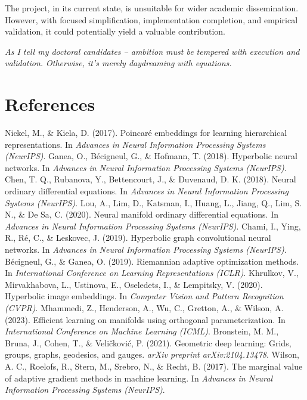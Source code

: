 \documentclass[11pt]{article}
\begin{document}
The project, in its current state, is unsuitable for wider academic dissemination. However, with focused simplification, implementation completion, and empirical validation, it could potentially yield a valuable contribution.

\textit{As I tell my doctoral candidates – ambition must be tempered with execution and validation. Otherwise, it's merely daydreaming with equations.}

\section{References}
\begin{thebibliography}{10}
 Nickel, M., \& Kiela, D. (2017). Poincaré embeddings for learning hierarchical representations. In \textit{Advances in Neural Information Processing Systems (NeurIPS)}.
 Ganea, O., Bécigneul, G., \& Hofmann, T. (2018). Hyperbolic neural networks. In \textit{Advances in Neural Information Processing Systems (NeurIPS)}.
 Chen, T. Q., Rubanova, Y., Bettencourt, J., \& Duvenaud, D. K. (2018). Neural ordinary differential equations. In \textit{Advances in Neural Information Processing Systems (NeurIPS)}.
 Lou, A., Lim, D., Katsman, I., Huang, L., Jiang, Q., Lim, S. N., \& De Sa, C. (2020). Neural manifold ordinary differential equations. In \textit{Advances in Neural Information Processing Systems (NeurIPS)}.
 Chami, I., Ying, R., Ré, C., \& Leskovec, J. (2019). Hyperbolic graph convolutional neural networks. In \textit{Advances in Neural Information Processing Systems (NeurIPS)}.
 Bécigneul, G., \& Ganea, O. (2019). Riemannian adaptive optimization methods. In \textit{International Conference on Learning Representations (ICLR)}.
 Khrulkov, V., Mirvakhabova, L., Ustinova, E., Oseledets, I., \& Lempitsky, V. (2020). Hyperbolic image embeddings. In \textit{Computer Vision and Pattern Recognition (CVPR)}.
 Mhammedi, Z., Henderson, A., Wu, C., Gretton, A., \& Wilson, A. (2023). Efficient learning on manifolds using orthogonal parameterization. In \textit{International Conference on Machine Learning (ICML)}.
 Bronstein, M. M., Bruna, J., Cohen, T., \& Veličković, P. (2021). Geometric deep learning: Grids, groups, graphs, geodesics, and gauges. \textit{arXiv preprint arXiv:2104.13478}. %
 Wilson, A. C., Roelofs, R., Stern, M., Srebro, N., \& Recht, B. (2017). The marginal value of adaptive gradient methods in machine learning. In \textit{Advances in Neural Information Processing Systems (NeurIPS)}.
\end{thebibliography}
\end{document}
